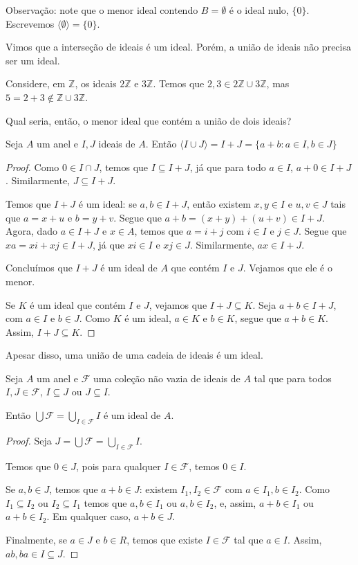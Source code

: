 Observação: note que o menor ideal contendo $B=\emptyset$ é o ideal nulo, $\{0\}$.
Escrevemos $\langle \emptyset\rangle=\{0\}$.

Vimos que a interseção de ideais é um ideal. Porém, a união de ideais não precisa ser um ideal.

\begin{exemplo} Considere, em $\mathbb Z$, os ideais $2\mathbb Z$ e $3\mathbb Z$. Temos que $2, 3 \in 2\mathbb Z\cup 3\mathbb Z$, mas $5=2+3\notin \mathbb Z\cup 3\mathbb Z$.
\end{exemplo}

Qual seria, então, o menor ideal que contém a união de dois ideais?
\begin{prop}
    Seja $A$ um anel e $I, J$ ideais de $A$. Então $\langle I\cup J\rangle=I+J=\{a+b: a \in I, b \in J\}$
\end{prop}
\begin{proof}
Como $0\in I\cap J$, temos que $I\subseteq I+J$, já que para todo $a \in I$, $a+0\in I+J$.
Similarmente, $J\subseteq I+J$.

Temos que $I+J$ é um ideal: se $a, b \in I+J$, então existem $x, y \in I$ e $u, v \in J$ tais que $a=x+u$ e $b=y+v$.
Segue que $a+b=(x+y)+(u+v)\in I+J$.
Agora, dado $a \in I+J$ e $x \in A$, temos que $a=i+j$ com $i \in I$ e $j \in J$.
Segue que $xa=xi+xj\in I+J$, já que $xi \in I$ e $xj \in J$. 
Similarmente, $ax\in I+J$.

Concluímos que $I+J$ é um ideal de $A$ que contém $I$ e $J$. Vejamos que ele é o menor.

Se $K$ é um ideal que contém $I$ e $J$, vejamos que $I+J\subseteq K$.
Seja $a+b \in I+J$, com $a \in I$ e $b \in J$.
Como $K$ é um ideal, $a \in K$ e $b \in K$, segue que $a+b \in K$.
Assim, $I+J\subseteq K$.
\end{proof}

Apesar disso, uma união de uma cadeia de ideais é um ideal.

\begin{prop}
Seja $A$ um anel e $\mathcal F$ uma coleção não vazia de ideais de $A$ tal que para todos $I, J \in \mathcal F$, $I\subseteq J$ ou $J\subseteq I$.

Então $\bigcup \mathcal F=\bigcup_{I \in \mathcal F}I$ é um ideal de $A$.
\end{prop}
\begin{proof}
    Seja $J=\bigcup \mathcal F=\bigcup_{I \in \mathcal F}I$.

    Temos que $0 \in J$, pois para qualquer $I \in \mathcal F$, temos $0 \in I$.

    Se $a, b \in J$, temos que $a+b \in J$: existem $I_1, I_2 \in \mathcal F$ com $a \in I_1, b \in I_2$.
    Como $I_1\subseteq I_2$ ou $I_2\subseteq I_1$ temos que $a, b \in I_1$ ou $a, b \in I_2$, e, assim, $a+b \in I_1$ ou $a+b \in I_2$.
    Em qualquer caso, $a+b \in J$.

    Finalmente, se $a \in J$ e $b \in R$, temos que existe $I \in \mathcal F$ tal que $a \in I$.
    Assim, $ab, ba \in I\subseteq J$.
\end{proof}
